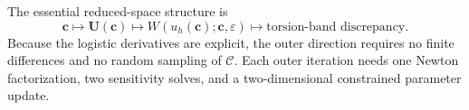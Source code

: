 \documentclass[11pt]{article}
\newcommand{\cC}{\mathcal{C}}
\newcommand{\bU}{\mathbf{U}}
\newcommand{\bc}{\mathbf{c}}
\begin{document}
The essential reduced-space structure is
\[
\boxed{
\bc
\longmapsto
\bU(\bc)
\longmapsto
W(u_h(\bc);\bc,\varepsilon)
\longmapsto
\text{torsion-band discrepancy}.
}
\]
Because the logistic derivatives are explicit, the outer direction requires no finite differences and no random sampling of $\cC$. Each outer iteration needs one Newton factorization, two sensitivity solves, and a two-dimensional constrained parameter update.
\end{document}
